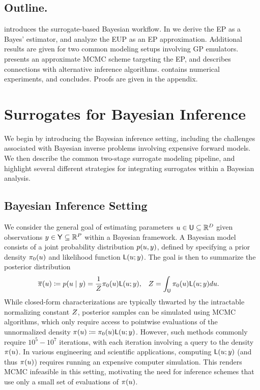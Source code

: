 \documentclass[12pt]{article}
\begin{document}
\subsection{Outline.}
 introduces the surrogate-based Bayesian workflow.
In  we derive the EP as a Bayes' estimator, and 
analyze the EUP as an EP approximation. Additional results are given for
two common modeling setups involving GP emulators.
 presents an approximate MCMC scheme targeting 
the EP, and describes connections with alternative inference algorithms. 
 contains numerical experiments, and 
 concludes. Proofs are given in the appendix.

\section{Surrogates for Bayesian Inference} \label{sec:surrogates-intro}
We begin by introducing the Bayesian inference setting, including the challenges
associated with Bayesian inverse problems involving expensive forward models. 
We then describe the common two-stage surrogate modeling pipeline, and highlight 
several different strategies for integrating surrogates within a Bayesian analysis.

\subsection{Bayesian Inference Setting}
We consider the general goal of estimating parameters $u \in \mathsf{U} \subseteq \mathbb{R}^{D}$ given 
observations $y \in \mathsf{Y} \subseteq \mathbb{R}^{P}$ within a Bayesian framework.
A Bayesian model consists of a joint probability distribution $p(u, y)$, defined by 
specifying a prior density $\pi_0(u)$ and likelihood function $\mathsf{L}(u; y)$.
The goal is then to summarize the posterior distribution 
\begin{align}
&\overline{\pi}(u) \coloneqq p(u \mid y) = \frac{1}{Z} \pi_0(u) \mathsf{L}(u; y), 
&&Z = \int_{\mathsf{U}} \pi_0(u) \mathsf{L}(u; y) du. \label{eq:post_dens_generic}
\end{align}
While closed-form characterizations are typically thwarted by the intractable normalizing constant
$Z$, posterior samples can be simulated using MCMC algorithms, which only require 
access to pointwise evaluations of the unnormalized density 
$\pi(u) \coloneqq \pi_0(u) \mathsf{L}(u; y)$.
However, such methods commonly require $10^5 - 10^7$ iterations, with each iteration 
involving a query to the density $\pi(u)$.
In various engineering and scientific applications, computing $\mathsf{L}(u; y)$ (and thus
$\pi(u)$) requires running an expensive computer simulation. 
This renders MCMC infeasible in this setting, motivating the need for inference schemes
that use only a small set of evaluations of $\pi(u)$.
 
\end{document}
